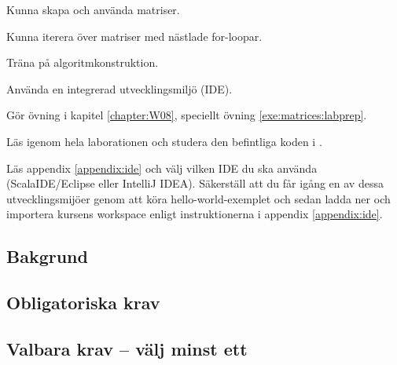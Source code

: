 
\Lab{\LabWeekEIGHT}

\begin{Goals}
\item Kunna skapa och använda matriser.
\item Kunna iterera över matriser med nästlade for-loopar.
\item Träna på algoritmkonstruktion.
\item Använda en integrerad utvecklingsmiljö (IDE).
\end{Goals}

\begin{Preparations}
\item Gör övning {\tt \ExeWeekEIGHT} i kapitel \ref{chapter:W08}, speciellt övning \ref{exe:matrices:labprep}.

\item Läs igenom hela laborationen och studera den befintliga koden i \TODO {}.

\item Läs appendix \ref{appendix:ide} och välj vilken IDE du ska använda (ScalaIDE/Eclipse eller IntelliJ IDEA). Säkerställ att du får igång en av dessa utvecklingsmijöer genom att köra hello-world-exemplet och sedan ladda ner och importera kursens \TODO workspace enligt instruktionerna i appendix \ref{appendix:ide}.
\end{Preparations}

\subsection{Bakgrund}



\subsection{Obligatoriska krav}



\subsection{Valbara krav -- välj minst ett}
